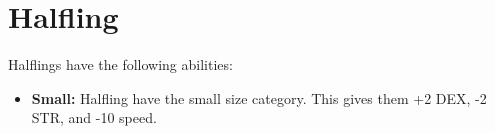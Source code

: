 \section{Halfling}\label{halfling}

Halflings have the following abilities:
\begin{itemize}
    \item \textbf{Small:} Halfling have the small size category. This gives
        them +2 DEX, -2 STR, and -10 speed.
\end{itemize}
